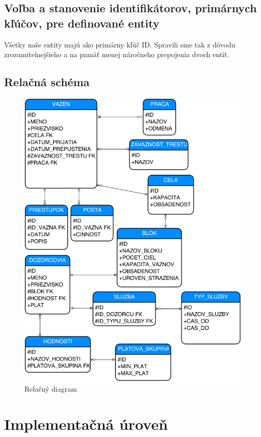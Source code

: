 \documentclass[slovak, 12pt, Times New Roman]{article}
\begin{document}
		\subsection{Voľba a stanovenie identifikátorov, primárnych kľúčov, pre definované entity}
			Všetky naše entity majú ako primárny kľúč ID. Spravili sme tak z dôvodu zrozumitelnejšieho a na pamäť menej náročneho prepojenia dvoch entít.
		\clearpage
		\subsection{Relačná schéma}	
			\begin{figure}[!htb]
				\centering
				\includegraphics[scale=0.6]{relacnyDia.png}
				\caption{Relačný diagram}
				\label{fig:Reinforcement}
			\end{figure}
	\section{Implementačná úroveň}
\end{document}
